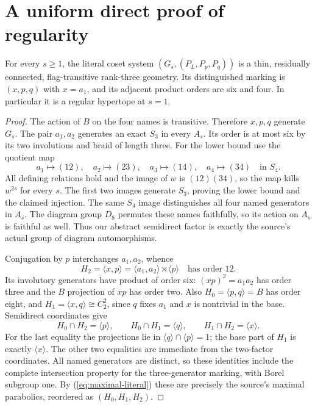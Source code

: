 \section{A uniform direct proof of regularity}
\begin{theorem}\label{thm:regular}
For every $s\geq1$, the literal coset system
$(G_s,(P_L,P_p,P_q))$ is a thin, residually connected,
flag-transitive rank-three geometry. Its distinguished marking is
$(x,p,q)$ with $x=a_1$, and its adjacent product orders are six
and four. In particular it is a regular hypertope at $s=1$.
\end{theorem}
\begin{proof}
The action of $B$ on the four names is transitive. Therefore $x,p,q$
generate $G_s$. The pair $a_1,a_2$ generates an exact $S_3$ in
every $A_s$. Its order is at most six by its two involutions and
braid of length three. For the lower bound use the quotient map
\[
 a_1\mapsto(12),\quad a_2\mapsto(23),\quad
 a_3\mapsto(14),\quad a_4\mapsto(34)
 \quad\text{in }S_4.
\]
All defining relations hold and the image of $w$ is $(12)(34)$,
so the map kills $w^{2s}$ for every $s$. The first two images
generate $S_3$, proving the lower bound and the claimed injection.
The same $S_4$ image distinguishes all four named generators in $A_s$.
The diagram group $D_8$ permutes these names faithfully, so its action
on $A_s$ is faithful as well. Thus our abstract semidirect factor is
exactly the source's actual group of diagram automorphisms.

Conjugation by $p$ interchanges $a_1,a_2$, whence
\[
 H_2=\langle x,p\rangle=\langle a_1,a_2\rangle\rtimes\langle p\rangle
 \quad\text{has order }12.
\]
Its involutory generators have product of order six:
$(xp)^2=a_1a_2$ has order three and the $B$ projection of $xp$
has order two. Also $H_0=\langle p,q\rangle=B$ has order eight,
and $H_1=\langle x,q\rangle\cong C_2^2$, since $q$ fixes $a_1$
and $x$ is nontrivial in the base. Semidirect coordinates give
\begin{equation}\label{eq:intersections}
 H_0\cap H_2=\langle p\rangle,\qquad
 H_0\cap H_1=\langle q\rangle,\qquad
 H_1\cap H_2=\langle x\rangle.
\end{equation}
For the last equality the projections lie in
$\langle q\rangle\cap\langle p\rangle=1$; the base part of
$H_1$ is exactly $\langle x\rangle$. The other two equalities
are immediate from the two-factor coordinates. All named generators
are distinct, so these identities include the complete intersection
property for the three-generator marking, with Borel subgroup one.
By (\ref{eq:maximal-literal}) these are precisely the source's maximal
parabolics, reordered as $(H_0,H_1,H_2)$.


\end{proof}
